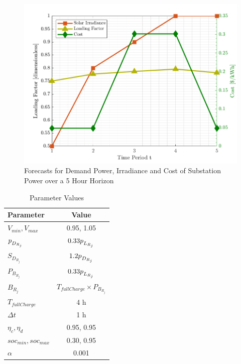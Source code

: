 \documentclass[../../outputs/main.tex]{subfiles}
\begin{document}
\begin{figure}[h!]
    \centering
    \includegraphics[height=0.25\textheight]{../figures/T5-inputCurves/InputCurves_Horizon_5.png}
    \caption{Forecasts for Demand Power, Irradiance and Cost of Substation Power over a 5 Hour Horizon}
    \label{fig:inputCurve-5}
\end{figure}

\def\ds{\rule{0pt}{1.5ex}} %

\begin{table}[h!]
    \centering
    \caption{Parameter Values}
    \begin{tabular}{|l|c|}
    \hline
    \textbf{Parameter} & \textbf{Value} \\ \hline
    $V_{min}, V_{max}$ & 0.95, 1.05 \\ \hline
    $p_{\ds D_{R_j}}$ & $0.33 p_{\ds L_{R_j}}$ \\ \hline
    $S_{D_{R_j}}$ & $1.2 p_{\ds D_{R_j}}$ \\ \hline
    $P_{B_{R_j}}$ & $0.33 p_{\ds L_{R_j}}$ \\ \hline
    $B_{R_j}$ & $T_{fullCharge} \times P_{B_{R_j}}$ \\ \hline
    $T_{fullCharge}$ & 4 h \\ \hline
    $\Delta t$ & 1 h \\ \hline
    $\eta_c, \eta_d$ & 0.95, 0.95 \\ \hline
    $soc_{min}, soc_{max}$ & 0.30, 0.95 \\ \hline
    $\alpha$ & 0.001 \\ \hline
    \end{tabular}
    \label{table:parameter-values}
\end{table}
\end{document}
